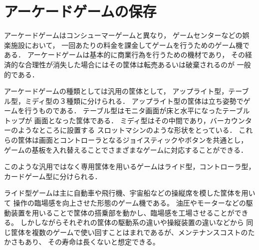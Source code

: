 \section{アーケードゲームの保存}
\label{sec:arcade}

アーケードゲームはコンシューマーゲームと異なり，
ゲームセンターなどの娯楽施設において，
一回あたりの料金を課金してゲームを行うためのゲーム機である．
アーケードゲームは基本的に商業行為を行うための機材であり，
その経済的な合理性が消失した場合にはその筐体は転売あるいは破棄されるのが
一般的である．

アーケードゲームの種類としては汎用の筐体として，
アップライト型，テーブル型，ミディ型の３種類に分けられる．
アップライト型の筐体は立ち姿勢でゲームを行うものである．
テーブル型はモニタ画面が床と水平になったテーブルトップが
画面となった筐体である．
ミディ型はその中間であり，バーカウンターのようなところに設置する
スロットマシンのような形状をとっている．
これらの筐体は画面とコントローラとなるジョイスティックやボタンを共通とし，
ゲームの基板を入れ替えることでさまざまなゲームに対応することができる．


このような汎用ではなく専用筐体を用いるゲームはライド型，コントローラ型，
カードゲーム型に分けられる．

ライド型ゲームは主に自動車や飛行機、宇宙船などの操縦席を模した筐体を用いて
操作の臨場感を向上させた形態のゲーム機である。
油圧やモーターなどの駆動装置を用いることで筐体の搭乗部を動かし、臨場感を工場させることができる。
しかしながらそれぞれの筐体の駆動系の違いや操縦装置の違いなどから
同じ筐体を複数のゲームで使い回すことはまれであるが、メンテナンスコストのたかさもあり、
その寿命は長くないと想定できる。
